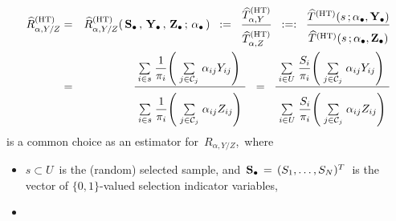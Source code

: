 \begin{itemize}
    \begin{eqnarray*}
    \widehat{R}^{\textnormal{(HT)}}_{\alpha,Y/Z}
    & = &
        \widehat{R}^{\textnormal{(HT)}}_{\alpha,Y/Z}(\,
            \Sdot\,,\,
            \Ydot\,,\,
            \Zdot\,;\,
            \abullet
            \,)
    \;\; := \;\;
        \dfrac{
            \widehat{T}^{\textnormal{(HT)}}_{\alpha,Y}
            }{
            \overset{{\color{white}.}}{
                \widehat{T}^{\textnormal{(HT)}}_{\alpha,Z}
                }
            }
    \;\; :=: \;\;
        \dfrac{
            \widehat{T}^{\textnormal{(HT)}}(s\,;\abullet,\Ydot)
            }{
            \overset{{\color{white}.}}{
                \widehat{T}^{\textnormal{(HT)}}(s\,;\abullet,\Zdot)
                }
            }
    \\
    & = &
        \dfrac{
            {\color{white}.}
            \underset{i \in s}{\sum}\;
                \dfrac{1}{\pi_{i}}\!
                \left(\;
                    \underset{j \in \mathcal{C}_{j}}{\sum}\;
                    \alpha_{ij}Y_{ij}
                    \right)
            {\color{white}.}
            }{
            \overset{{\color{white}.}}{
                \underset{i \in s}{\sum}\;
                    \dfrac{1}{\pi_{i}}\!
                    \left(\;
                        \underset{j \in \mathcal{C}_{j}}{\sum}\;
                        \alpha_{ij}Z_{ij}
                        \right)
                }
            }
    \;\; = \;\;
        \dfrac{
            {\color{white}.}
            \underset{i \in U}{\sum}\;
                \dfrac{S_{i}}{\pi_{i}}\!
                \left(\;
                    \underset{j \in \mathcal{C}_{j}}{\sum}\;
                    \alpha_{ij}Y_{ij}
                    \right)
            {\color{white}.}
            }{
            \overset{{\color{white}.}}{
                \underset{i \in U}{\sum}\;
                    \dfrac{S_{i}}{\pi_{i}}\!
                    \left(\;
                        \underset{j \in \mathcal{C}_{j}}{\sum}\;
                        \alpha_{ij}Z_{ij}
                        \right)
                }
            }
    \end{eqnarray*}
    is a common choice as an estimator for
    \,$R_{\alpha,Y/Z}$,\,
    where
    \begin{itemize}
    \item
        $s \subset U$\, is the (random) selected sample, and
        \,$\mathbf{S}_{\bullet} \,=\, (S_{1},\ldots,S_{N})^{T}$\,
        is the vector of $\{0,1\}$-valued selection indicator variables,
    \item

\end{itemize}
\end{itemize}
